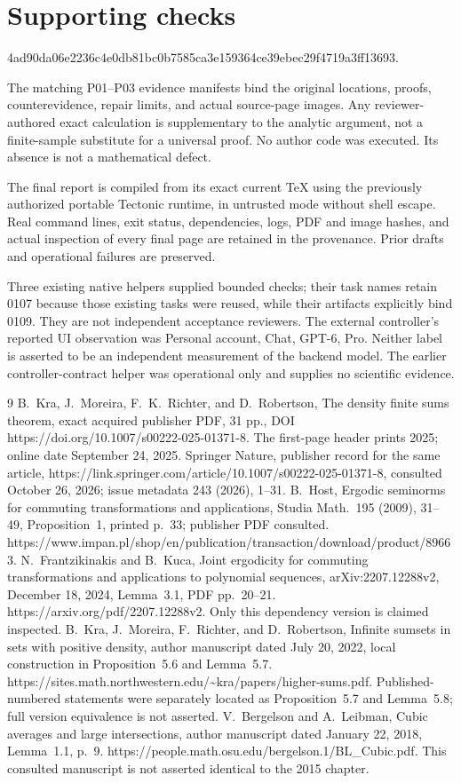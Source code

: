 \documentclass[10pt]{article}
\begin{document}
\section*{Supporting checks}
4ad90da06e2236c4e0db81bc0b7585ca3e159364ce39ebec29f4719a3ff13693.\par
The matching P01–P03 evidence manifests bind the original locations, proofs, counterevidence, repair limits, and actual source-page images. Any reviewer-authored exact calculation is supplementary to the analytic argument, not a finite-sample substitute for a universal proof. No author code was executed. Its absence is not a mathematical defect.\par
The final report is compiled from its exact current TeX using the previously authorized portable Tectonic runtime, in untrusted mode without shell escape. Real command lines, exit status, dependencies, logs, PDF and image hashes, and actual inspection of every final page are retained in the provenance. Prior drafts and operational failures are preserved.\par
Three existing native helpers supplied bounded checks; their task names retain 0107 because those existing tasks were reused, while their artifacts explicitly bind 0109. They are not independent acceptance reviewers. The external controller’s reported UI observation was Personal account, Chat, GPT-6, Pro. Neither label is asserted to be an independent measurement of the backend model. The earlier controller-contract helper was operational only and supplies no scientific evidence.\par
9 B. Kra, J. Moreira, F. K. Richter, and D. Robertson, The density finite sums theorem, exact acquired publisher PDF, 31 pp., DOI https://doi.org/10.1007/s00222-025-01371-8. The first-page header prints 2025; online date September 24, 2025. Springer Nature, publisher record for the same article, https://link.springer.com/article/10.1007/s00222-025-01371-8, consulted October 26, 2026; issue metadata 243 (2026), 1–31. B. Host, Ergodic seminorms for commuting transformations and applications, Studia Math. 195 (2009), 31–49, Proposition 1, printed p. 33; publisher PDF consulted. https://www.impan.pl/shop/en/publication/transaction/download/product/89663. N. Frantzikinakis and B. Kuca, Joint ergodicity for commuting transformations and applications to polynomial sequences, arXiv:2207.12288v2, December 18, 2024, Lemma 3.1, PDF pp. 20–21. https://arxiv.org/pdf/2207.12288v2. Only this dependency version is claimed inspected. B. Kra, J. Moreira, F. Richter, and D. Robertson, Infinite sumsets in sets with positive density, author manuscript dated July 20, 2022, local construction in Proposition 5.6 and Lemma 5.7. https://sites.math.northwestern.edu/\textasciitilde{}kra/papers/higher-sums.pdf. Published-numbered statements were separately located as Proposition 5.7 and Lemma 5.8; full version equivalence is not asserted. V. Bergelson and A. Leibman, Cubic averages and large intersections, author manuscript dated January 22, 2018, Lemma 1.1, p. 9. https://people.math.osu.edu/bergelson.1/BL\_Cubic.pdf. This consulted manuscript is not asserted identical to the 2015 chapter.\par
\end{document}
